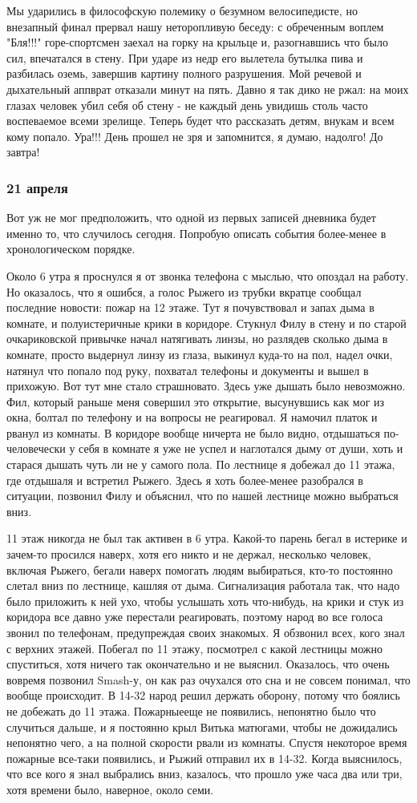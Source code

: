 \documentclass[12pt,a4paper]{article}
\newcommand{\ssubsection}[1]{
	\subsubsection*{#1}
	\addcontentsline{toc}{subsubsection}{#1}
}
\begin{document}
Мы ударились в философскую полемику о безумном велосипедисте, но внезапный финал прервал нашу неторопливую беседу: с обреченным воплем "Бля!!!" горе-спортсмен заехал на горку на крыльце и, разогнавшись что было сил, впечатался в стену. При ударе из недр его вылетела бутылка пива и разбилась оземь, завершив картину полного разрушения. Мой речевой и дыхательный аппврат отказали минут на пять. Давно я так дико не ржал: на моих глазах человек убил себя об стену - не каждый день увидишь столь часто воспеваемое всеми зрелище. Теперь будет что рассказать детям, внукам и всем кому попало. Ура!!! День прошел не зря и запомнится, я думаю, надолго! До завтра!

\ssubsection{21 апреля}
Вот уж не мог предположить, что одной из первых записей дневника будет именно то, что случилось сегодня. Попробую описать события более-менее в хронологическом порядке.

Около 6 утра я проснулся я от звонка телефона с мыслью, что опоздал на работу. Но оказалось, что я ошибся, а голос Рыжего из трубки вкратце сообщал последние новости: пожар на 12 этаже. Тут я почувствовал и запах дыма в комнате, и полуистеричные крики в коридоре. Стукнул Филу в стену и по старой очкариковской привычке начал натягивать линзы, но разлядев сколько дыма в комнате, просто выдернул линзу из глаза, выкинул куда-то на пол, надел очки, натянул что попало под руку, похватал телефоны и документы и вышел в прихожую. Вот тут мне стало страшновато. Здесь уже дышать было невозможно. Фил, который раньше меня совершил это открытие, высунувшись как мог из окна, болтал по телефону и на вопросы не реагировал. Я намочил платок и рванул из комнаты. В коридоре вообще ничерта не было видно, отдышаться по-человечески у себя в комнате я уже не успел и наглотался дыму от души, хоть и старася дышать чуть ли не у самого пола. По лестнице я добежал до 11 этажа, где отдышаля и встретил Рыжего. Здесь я хоть более-менее разобрался в ситуации, позвонил Филу и объяснил, что по нашей лестнице можно выбраться вниз.

11 этаж никогда не был так активен в 6 утра. Какой-то парень бегал в истерике и зачем-то просился наверх, хотя его никто и не держал, несколько человек, включая Рыжего, бегали наверх помогать людям выбираться, кто-то постоянно слетал вниз по лестнице, кашляя от дыма. Сигнализация работала так, что надо было приложить к ней ухо, чтобы услышать хоть что-нибудь, на крики и стук из коридора все давно уже перестали реагировать, поэтому народ во все голоса звонил по телефонам, предупреждая своих знакомых. Я обзвонил всех, кого знал с верхних этажей. Побегал по 11 этажу, посмотрел с какой лестницы можно спуститься, хотя ничего так окончательно и не выяснил. Оказалось, что очень вовремя позвонил Smash-у, он как раз очухался ото сна и не совсем понимал, что вообще происходит. В 14-32 народ решил держать оборону, потому что боялись не добежать до 11 этажа. Пожарныееще не появились, непонятно было что случиться дальше, и я постоянно крыл Витька матюгами, чтобы не дожидались непонятно чего, а на полной скорости рвали из комнаты. Спустя некоторое время пожарные все-таки появились, и Рыжий отправил их в 14-32. Когда выяснилось, что все кого я знал выбрались вниз, казалось, что прошло уже часа два или три, хотя времени было, наверное, около семи. 
\end{document}
